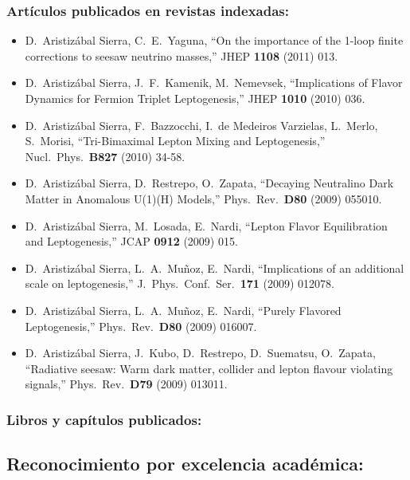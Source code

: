 \subsubsection{Artículos publicados en revistas indexadas:}
\begin{itemize}
\item   D.~Aristizábal Sierra, C.~E.~Yaguna,
  ``On the importance of the 1-loop finite corrections to seesaw neutrino masses,''
  JHEP {\bf 1108 } (2011)  013.

\item   D.~Aristizábal Sierra, J.~F.~Kamenik, M.~Nemevsek,
  ``Implications of Flavor Dynamics for Fermion Triplet Leptogenesis,''
  JHEP {\bf 1010 } (2010)  036.

\item   D.~Aristizábal Sierra, F.~Bazzocchi, I.~de Medeiros Varzielas, L.~Merlo, S.~Morisi,
  ``Tri-Bimaximal Lepton Mixing and Leptogenesis,''
  Nucl.\ Phys.\  {\bf B827 } (2010)  34-58.

\item   D.~Aristizábal Sierra, D.~Restrepo, O.~Zapata,
  ``Decaying Neutralino Dark Matter in Anomalous U(1)(H) Models,''
  Phys.\ Rev.\  {\bf D80 } (2009)  055010.

\item   D.~Aristizábal Sierra, M.~Losada, E.~Nardi,
  ``Lepton Flavor Equilibration and Leptogenesis,''
  JCAP {\bf 0912 } (2009)  015.

\item   D.~Aristizábal Sierra, L.~A.~Muñoz, E.~Nardi,
  ``Implications of an additional scale on leptogenesis,''
  J.\ Phys.\ Conf.\ Ser.\  {\bf 171 } (2009)  012078.

\item   D.~Aristizábal Sierra, L.~A.~Muñoz, E.~Nardi,
  ``Purely Flavored Leptogenesis,''
  Phys.\ Rev.\  {\bf D80 } (2009)  016007.

\item   D.~Aristizábal Sierra, J.~Kubo, D.~Restrepo, D.~Suematsu, O.~Zapata,
  ``Radiative seesaw: Warm dark matter, collider and lepton flavour violating signals,''
  Phys.\ Rev.\  {\bf D79 } (2009)  013011.

\end{itemize}
\subsubsection{Libros y capítulos publicados:}
\subsection{Reconocimiento por excelencia académica:}
